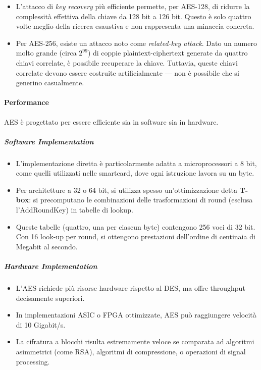 \documentclass{report}
\begin{document}
\begin{itemize}
    \item L’attacco di \textit{key recovery} più efficiente permette, per AES-128, di ridurre la complessità effettiva della chiave da 128 bit a 126 bit. Questo è solo quattro volte meglio della ricerca esaustiva e non rappresenta una minaccia concreta.
    \item Per AES-256, esiste un attacco noto come \textit{related-key attack}. Dato un numero molto grande (circa $2^{99}$) di coppie plaintext-ciphertext generate da quattro chiavi correlate, è possibile recuperare la chiave. Tuttavia, queste chiavi correlate devono essere costruite artificialmente — non è possibile che si generino casualmente.
\end{itemize}

\paragraph{Performance}

AES è progettato per essere efficiente sia in software sia in hardware.

\subparagraph{Software Implementation}
\begin{itemize}
    \item L'implementazione diretta è particolarmente adatta a microprocessori a 8 bit, come quelli utilizzati nelle smartcard, dove ogni istruzione lavora su un byte.
    \item Per architetture a 32 o 64 bit, si utilizza spesso un’ottimizzazione detta \textbf{T-box}: si precomputano le combinazioni delle trasformazioni di round (esclusa l’AddRoundKey) in tabelle di lookup.
    \item Queste tabelle (quattro, una per ciascun byte) contengono 256 voci di 32 bit. Con 16 look-up per round, si ottengono prestazioni dell’ordine di centinaia di Megabit al secondo.
\end{itemize}

\subparagraph{Hardware Implementation}
\begin{itemize}
    \item L’AES richiede più risorse hardware rispetto al DES, ma offre throughput decisamente superiori.
    \item In implementazioni ASIC o FPGA ottimizzate, AES può raggiungere velocità di 10 Gigabit/s.
    \item La cifratura a blocchi risulta estremamente veloce se comparata ad algoritmi asimmetrici (come RSA), algoritmi di compressione, o operazioni di signal processing.
\end{itemize}
\end{document}
